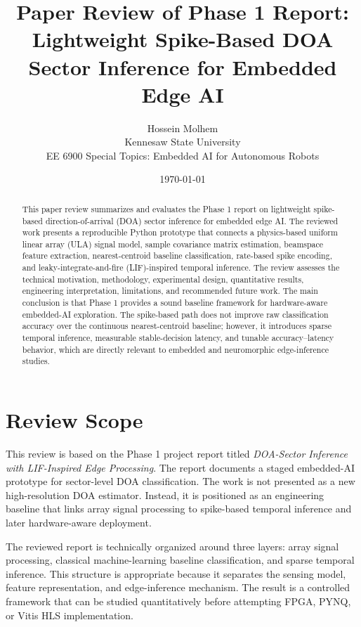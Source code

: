 \documentclass[11pt]{article}
\title{Paper Review of Phase 1 Report:\\Lightweight Spike-Based DOA Sector Inference for Embedded Edge AI}
\author{Hossein Molhem\\Kennesaw State University\\EE 6900 Special Topics: Embedded AI for Autonomous Robots}
\date{\today}
\begin{document}
\maketitle

\begin{abstract}
This paper review summarizes and evaluates the Phase 1 report on lightweight spike-based direction-of-arrival (DOA) sector inference for embedded edge AI. The reviewed work presents a reproducible Python prototype that connects a physics-based uniform linear array (ULA) signal model, sample covariance matrix estimation, beamspace feature extraction, nearest-centroid baseline classification, rate-based spike encoding, and leaky-integrate-and-fire (LIF)-inspired temporal inference. The review assesses the technical motivation, methodology, experimental design, quantitative results, engineering interpretation, limitations, and recommended future work. The main conclusion is that Phase 1 provides a sound baseline framework for hardware-aware embedded-AI exploration. The spike-based path does not improve raw classification accuracy over the continuous nearest-centroid baseline; however, it introduces sparse temporal inference, measurable stable-decision latency, and tunable accuracy--latency behavior, which are directly relevant to embedded and neuromorphic edge-inference studies.
\end{abstract}

\section{Review Scope}

This review is based on the Phase 1 project report titled \emph{DOA-Sector Inference with LIF-Inspired Edge Processing}. The report documents a staged embedded-AI prototype for sector-level DOA classification. The work is not presented as a new high-resolution DOA estimator. Instead, it is positioned as an engineering baseline that links array signal processing to spike-based temporal inference and later hardware-aware deployment.

The reviewed report is technically organized around three layers: array signal processing, classical machine-learning baseline classification, and sparse temporal inference. This structure is appropriate because it separates the sensing model, feature representation, and edge-inference mechanism. The result is a controlled framework that can be studied quantitatively before attempting FPGA, PYNQ, or Vitis HLS implementation.
\end{document}
